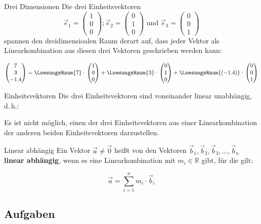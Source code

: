 \begin{bemerkung}{Drei Dimensionen}{}
  Die drei Einheitsvektoren
  $$\vec{e}_1=\begin{pmatrix}1\\0\\0\end{pmatrix};
  \vec{e}_2=\begin{pmatrix}0\\1\\0\end{pmatrix} \text{ und }
  \vec{e}_3=\begin{pmatrix}0\\0\\1\end{pmatrix}$$
spannen den dreidimensioalen Raum derart auf, dass jeder Vektor als
Linearkombination aus diesen drei Vektoren geschrieben werden kann:

$$\begin{pmatrix}7\\3\\-1.4\end{pmatrix}=
  \LoesungsRaum{7}\cdot{}\begin{pmatrix}1\\0\\0\end{pmatrix} +
  \LoesungsRaum{3}\cdot{}\begin{pmatrix}0\\1\\0\end{pmatrix} +
  \LoesungsRaum{(-1.4)}\cdot{}\begin{pmatrix}0\\0\\1\end{pmatrix}$$
\end{bemerkung}

\begin{gesetz}{Einheitsvektoren}{}
  Die drei Einheitsvektoren sind voneinander linear unabhängig, d.\,h.:

  Es ist nicht möglich, einen der drei Einheitsvektoren aus einer
  Linearkombination der anderen beiden Einheitsvektoren darzustellen.
\end{gesetz}

\begin{definition}{Linear abhängig}{}
  Ein Vektor $\vec{a}\ne \vec{0}$ heißt von den Vektoren $\vec{b}_1, \vec{b}_2,
  \vec{b}_3, ... , \vec{b}_n$ \textbf{linear abhängig}, wenn es eine
  Linearkombination mit $m_i \in \mathbb{R}$ gibt, für die gilt:

  $$\vec{a} = \sum_{i=1}^{n}m_i\cdot{}\vec{b}_i$$
  \end{definition}
  
\subsection*{Aufgaben}
